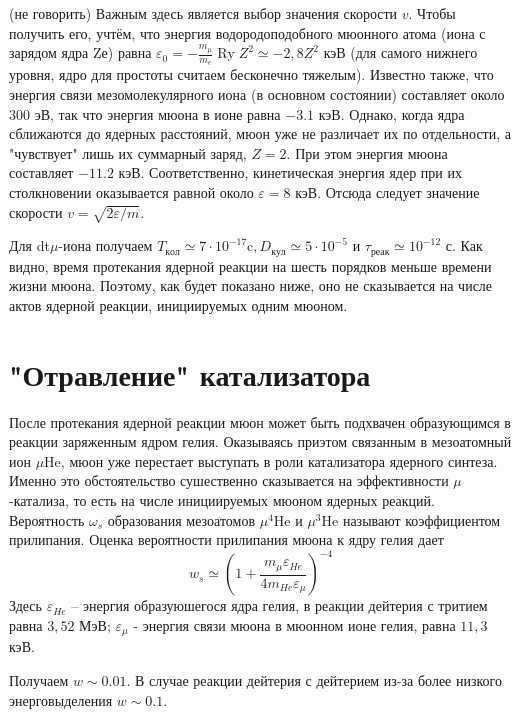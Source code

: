 \documentclass[12pt]{kiarticle} %
\begin{document}
(не говорить) Важным здесь является выбор значения скорости $v$. Чтобы получить его, учтём, что энергия водородоподобного мюонного атома (иона с зарядом ядра Zе) равна $\varepsilon_{0}=-\frac{m_{\mu}}{m_{e}} \operatorname{Ry} Z^{2} \simeq-2,8 Z^{2}$ кэВ (для самого нижнего уровня, ядро для простоты считаем бесконечно тяжелым). Известно также, что энергия связи мезомолекулярного иона (в основном состоянии) составляет около $300$ эВ, так что энергия мюона в ионе равна $-3.1$ кэВ. Однако, когда ядра сближаются до ядерных расстояний, мюон уже не различает их по отдельности, а "чувствует" лишь их суммарный заряд, $Z=2 .$ При этом энергия мюона составляет $-11.2$ кэВ. Соответственно, кинетическая энергия ядер при их столкновении оказывается равной около $\varepsilon=8$ кэВ. Отсюда следует значение скорости $v=\sqrt{2 \varepsilon / m}$. 

Для dt$\mu$-иона получаем $T_{кол} \simeq 7 \cdot 10^{-17} \text{c}, D_{ кул} \simeq 5 \cdot 10^{-5}$ и $\tau_{\text {реак}} \simeq 10^{-12}$ с. Как видно, время протекания ядерной реакции на шесть порядков меньше времени жизни мюона. Поэтому, как будет показано ниже, оно не сказывается на числе актов ядерной реакции, инициируемых одним мюоном.

\section{"Отравление" катализатора}

После протекания ядерной реакции мюон может быть подхвачен образующимся в реакции заряженным ядром гелия. Оказываясь приэтом связанным в мезоатомный ион $\mu\mathrm{He}$, мюон уже перестает выступать в роли катализатора ядерного синтеза. Именно это обстоятельство сушественно сказывается на эффективности $\mu$-катализа, то есть на числе инициируемых мюоном ядерных реакций. Вероятность $\omega_{s}$ образования мезоатомов $\mu^{4}\mathrm{He}$ и $\mu^{3}\mathrm{He}$ называют коэффициентом прилипания. Оценка вероятности прилипания мюона к ядру гелия дает
\begin{equation} 
w_{s} \simeq\left(1+\frac{m_{\mu} \varepsilon_{H e}}{4 m_{H e} \varepsilon_{\mu}}\right)^{-4}
\end{equation}
Здесь $\varepsilon_{H e}$ -- энергия образуюшегося ядра гелия, в реакции дейтерия с тритием равна $3,52$ МэВ; $\varepsilon_{\mu}$ - энергия связи мюона в мюонном ионе гелия, равна $11,3$ кэВ.

Получаем $w \sim 0.01$. В случае реакции дейтерия с дейтерием из-за более низкого энерговыделения $w \sim 0.1$.
\end{document}
